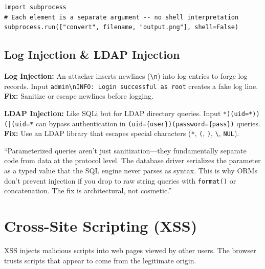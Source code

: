 \documentclass[11pt, letterpaper]{article}
\newcommand{\talkingpoint}[1]{%
  \begin{tcolorbox}[colback=talkbg, colframe=talkborder,
    title={\bfseries Interview Talking Point}, arc=3pt, boxrule=1pt]
  #1
  \end{tcolorbox}%
}
\begin{document}
\begin{lstlisting}[style=safe, caption={SECURE: pass arguments as a list, never shell=True with user input}]
import subprocess
# Each element is a separate argument -- no shell interpretation
subprocess.run(["convert", filename, "output.png"], shell=False)
\end{lstlisting}

\subsection*{Log Injection \& LDAP Injection}

\textbf{Log Injection:} An attacker inserts newlines (\texttt{\textbackslash n}) into log entries to forge log records. Input \texttt{admin\textbackslash nINFO: Login successful as root} creates a fake log line. \textbf{Fix:} Sanitize or escape newlines before logging.

\textbf{LDAP Injection:} Like SQLi but for LDAP directory queries. Input \texttt{*)(uid=*))(|(uid=*} can bypass authentication in \texttt{(uid=\{user\})(password=\{pass\})} queries. \textbf{Fix:} Use an LDAP library that escapes special characters (\texttt{*}, \texttt{(}, \texttt{)}, \texttt{\textbackslash}, \texttt{NUL}).

\talkingpoint{``Parameterized queries aren't just sanitization---they fundamentally separate code from data at the protocol level. The database driver serializes the parameter as a typed value that the SQL engine never parses as syntax. This is why ORMs don't prevent injection if you drop to raw string queries with \texttt{format()} or concatenation. The fix is architectural, not cosmetic.''}

\section*{Cross-Site Scripting (XSS)}

XSS injects malicious scripts into web pages viewed by other users. The browser trusts scripts that appear to come from the legitimate origin.
\end{document}
